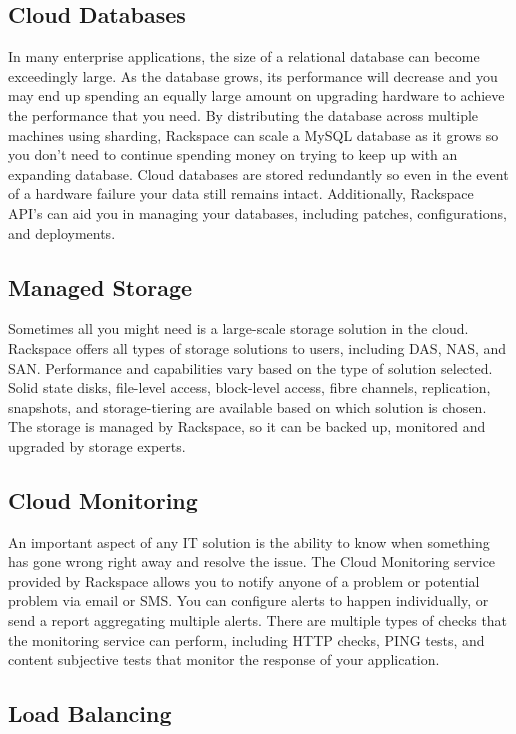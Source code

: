 \documentclass[DIV=calc, paper=letter, fontsize=12pt, twocolumn]{scrartcl}	 %
\begin{document}
\subsection*{Cloud Databases}

In many enterprise applications, the size of a relational database can
become exceedingly large. As the database grows, its performance will 
decrease and you may end up spending an equally large amount on upgrading
hardware to achieve the performance that you need. By distributing the
database across multiple machines using sharding, Rackspace can scale
a MySQL database as it grows so you don't need to continue spending 
money on trying to keep up with an expanding database. Cloud databases
are stored redundantly so even in the event of a hardware failure 
your data still remains intact. Additionally, Rackspace API's can aid
you in managing your databases, including patches, configurations, 
and deployments.

\subsection*{Managed Storage}

Sometimes all you might need is a large-scale storage solution in the 
cloud. Rackspace offers all types of storage solutions to users, 
including DAS, NAS, and SAN. Performance and capabilities vary
based on the type of solution selected. Solid state disks, file-level
access, block-level access, fibre channels, replication, snapshots,
and storage-tiering are available based on which solution is chosen.
The storage is managed by Rackspace, so it can be backed up, monitored
and upgraded by storage experts.

\subsection*{Cloud Monitoring}

An important aspect of any IT solution is the ability to know when
something has gone wrong right away and resolve the issue. The Cloud
Monitoring service provided by Rackspace allows you to notify anyone
of a problem or potential problem via email or SMS. You can configure
alerts to happen individually, or send a report aggregating multiple
alerts. There are multiple types of checks that the monitoring service
can perform, including HTTP checks, PING tests, and content subjective
tests that monitor the response of your application.

\subsection*{Load Balancing}
\end{document}
